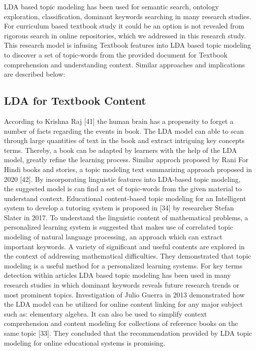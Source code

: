 \documentclass[sn-mathphys,Numbered]{sn-jnl}%
\theoremstyle{thmstyleone}%
\theoremstyle{thmstyletwo}%
\theoremstyle{thmstylethree}%
\begin{document}
LDA based topic modeling has been used for semantic search, ontology exploration, classification, dominant keywords searching in many research studies. For curriculum based textbook study it could be an option is not revealed from rigorous search in online repositories, which we addressed in this research study. This research model is infusing Textbook features into LDA based topic modeling to discover a set of topic-words from the provided document for Textbook comprehension and understanding context. Similar approaches and implications are described below:

\subsection{LDA for Textbook Content}

According to Krishna Raj {[}41{]} the human brain has a propensity to forget a number of facts regarding the events in book. The LDA model can able to scan through large quantities of text in the book and extract intriguing key concepts terms. Thereby, a book can be adapted by learners with the help of the LDA model, greatly refine the learning process. Similar approch proposed by  Rani For Hindi books and stories, a topic modeling text summarizing approach proposed in 2020 {[}42{]}. By incorporating linguistic features into LDA-based topic modeling, the suggested model is can find a set of topic-words from the given material to understand context.  Educational content-based topic modeling for an Intelligent system to develop a tutoring system is proposed in {[}34{]} by researcher Stefan Slater in 2017. To understand the linguistic content of mathematical problems, a personalized learning system is suggested that makes use of correlated topic modeling of natural language processing, an approach which can extract important keywords. A variety of significant and useful contents are explored in the context of addressing mathematical difficulties. They demonstrated that topic modeling is a useful method for a personalized learning systems. For key terms detection within articles LDA based topic modeling has been used in many research studies in which dominant keywords reveals future research trends or most prominent topics. Investigation of Julio Guerra in 2013 demonstrated how the LDA model can be utilized for online content linking for any major subject such as: elementary algebra. It can also be used to simplify context comprehension and content modeling for collections of reference books on the same topic {[}33{]}. They concluded that the recommendation provided by LDA topic modeling for online educational systems is promising.
\end{document}
